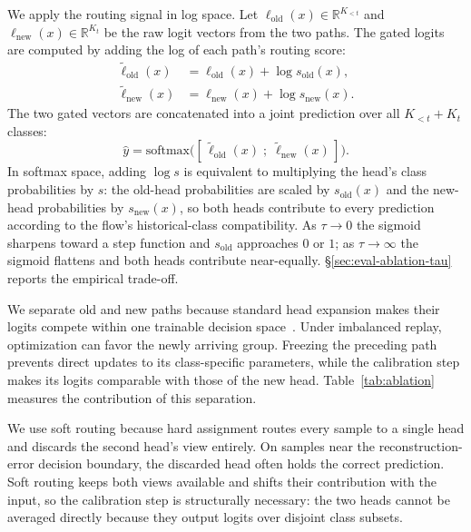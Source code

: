 We apply the routing signal in log space. Let $\ell_{\mathrm{old}}(x) \in \mathbb{R}^{K_{<t}}$ and $\ell_{\mathrm{new}}(x) \in \mathbb{R}^{K_t}$ be the raw logit vectors from the two paths. The gated logits are computed by adding the log of each path's routing score:
\begin{align}
\tilde{\ell}_{\mathrm{old}}(x) &= \ell_{\mathrm{old}}(x) + \log s_{\mathrm{old}}(x),\label{eq:routing-old}\\
\tilde{\ell}_{\mathrm{new}}(x) &= \ell_{\mathrm{new}}(x) + \log s_{\mathrm{new}}(x).\label{eq:routing-new}
\end{align}
The two gated vectors are concatenated into a joint prediction over all $K_{<t} + K_t$ classes:
\begin{equation}\label{eq:concat}
\hat{y} = \mathrm{softmax}\bigl([\,\tilde{\ell}_{\mathrm{old}}(x)\;;\;\tilde{\ell}_{\mathrm{new}}(x)\,]\bigr).
\end{equation}
In softmax space, adding $\log s$ is equivalent to multiplying the head's class probabilities by $s$: the old-head probabilities are scaled by $s_{\mathrm{old}}(x)$ and the new-head probabilities by $s_{\mathrm{new}}(x)$, so both heads contribute to every prediction according to the flow's historical-class compatibility. As $\tau \to 0$ the sigmoid sharpens toward a step function and $s_{\mathrm{old}}$ approaches $0$ or $1$; as $\tau \to \infty$ the sigmoid flattens and both heads contribute near-equally. \S\ref{sec:eval-ablation-tau} reports the empirical trade-off.

We separate old and new paths because standard head expansion makes their logits compete within one trainable decision space~\cite{rebuffi2017icarl,wu2019bic}. Under imbalanced replay, optimization can favor the newly arriving group. Freezing the preceding path prevents direct updates to its class-specific parameters, while the calibration step makes its logits comparable with those of the new head. Table~\ref{tab:ablation} measures the contribution of this separation.

We use soft routing because hard assignment routes every sample to a single head and discards the second head's view entirely. On samples near the reconstruction-error decision boundary, the discarded head often holds the correct prediction. Soft routing keeps both views available and shifts their contribution with the input, so the calibration step is structurally necessary: the two heads cannot be averaged directly because they output logits over disjoint class subsets.

